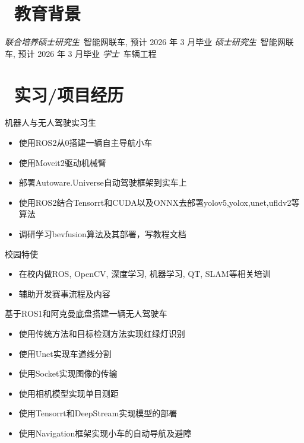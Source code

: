 \documentclass{resume}
\begin{document}


 
\section{\faGraduationCap\  教育背景}
\textit{联合培养硕士研究生}\ 智能网联车, 预计 2026 年 3 月毕业
\textit{硕士研究生}\ 智能网联车, 预计 2026 年 3 月毕业
\textit{学士}\ 车辆工程

\section{\faUsers\ 实习/项目经历}
\role{实习}{导师: 张新钰\ 赵建辉\ 赵虚左}
机器人与无人驾驶实习生
\begin{itemize}
  \item 使用ROS2从0搭建一辆自主导航小车
  \item 使用Moveit2驱动机械臂
  \item 部署Autoware.Universe自动驾驶框架到实车上
  \item 使用ROS2结合Tensorrt和CUDA以及ONNX去部署yolov5,yolox,unet,ufldv2等算法
  \item 调研学习bevfusion算法及其部署，写教程文档
\end{itemize}

校园特使
\begin{itemize}
  \item 在校内做ROS, OpenCV, 深度学习, 机器学习, QT, SLAM等相关培训
  \item 辅助开发赛事流程及内容
\end{itemize}

\begin{onehalfspacing}
基于ROS1和阿克曼底盘搭建一辆无人驾驶车
\begin{itemize}
  \item 使用传统方法和目标检测方法实现红绿灯识别
  \item 使用Unet实现车道线分割
  \item 使用Socket实现图像的传输
  \item 使用相机模型实现单目测距
  \item 使用Tensorrt和DeepStream实现模型的部署
  \item 使用Navigation框架实现小车的自动导航及避障
\end{itemize}
\end{onehalfspacing}
\end{document}
